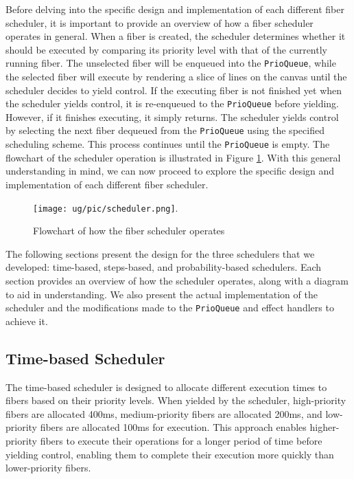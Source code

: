\documentclass[logo,bsc,singlespacing,parskip]{infthesis}
\begin{document}
Before delving into the specific design and implementation of each different fiber scheduler, it is important to provide an overview of how a fiber scheduler operates in general. When a fiber is created, the scheduler determines whether it should be executed by comparing its priority level with that of the currently running fiber. The unselected fiber will be enqueued into the \texttt{PrioQueue}, while the selected fiber will execute by rendering a slice of lines on the canvas until the scheduler decides to yield control. If the executing fiber is not finished yet when the scheduler yields control, it is re-enqueued to the \texttt{PrioQueue} before yielding. However, if it finishes executing, it simply returns. The scheduler yields control by selecting the next fiber dequeued from the \texttt{PrioQueue} using the specified scheduling scheme. This process continues until the \texttt{PrioQueue} is empty. The flowchart of the scheduler operation is illustrated in Figure \ref{fig:scheduler}. With this general understanding in mind, we can now proceed to explore the specific design and implementation of each different fiber scheduler.

\begin{figure}[htbp]
    \centering
    \texttt{[image: ug/pic/scheduler.png]}.
    \caption{Flowchart of how the fiber scheduler operates}
    \label{fig:scheduler}
\end{figure}

The following sections present the design for the three schedulers that we developed: time-based, steps-based, and probability-based schedulers. Each section provides an overview of how the scheduler operates, along with a diagram to aid in understanding. We also present the actual implementation of the scheduler and the modifications made to the \texttt{PrioQueue} and effect handlers to achieve it.

\subsection{Time-based Scheduler}

The time-based scheduler is designed to allocate different execution times to fibers based on their priority levels. When yielded by the scheduler, high-priority fibers are allocated 400ms, medium-priority fibers are allocated 200ms, and low-priority fibers are allocated 100ms for execution. This approach enables higher-priority fibers to execute their operations for a longer period of time before yielding control, enabling them to complete their execution more quickly than lower-priority fibers.
\end{document}
